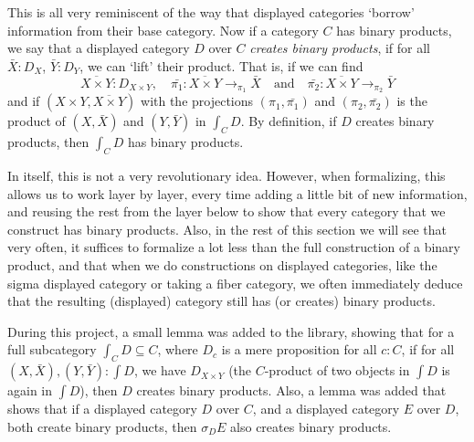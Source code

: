 This is all very reminiscent of the way that displayed categories `borrow' information from their base category. Now if a category $ C $ has binary products, we say that a displayed category $ D $ over $ C $ \textit{creates binary products}, if for all $ \bar X : D_X $, $ \bar Y : D_Y $, we can `lift' their product. That is, if we can find
\[ \overline{X \times Y} : D_{X \times Y}, \quad \bar{\pi_1} : \overline{X \times Y} \to_{\pi_1} \bar X \quad \text{and} \quad \bar{\pi_2} : \overline{X \times Y} \to_{\pi_2} \bar Y \]
and if $ (X \times Y, \overline{X \times Y}) $ with the projections $ (\pi_1, \bar{\pi_1}) $ and $ (\pi_2, \bar{\pi_2}) $ is the product of $ (X, \bar X) $ and $ (Y, \bar Y) $ in $ \int_C D $. By definition, if $ D $ creates binary products, then $ \int_C D $ has binary products.

In itself, this is not a very revolutionary idea. However, when formalizing, this allows us to work layer by layer, every time adding a little bit of new information, and reusing the rest from the layer below to show that every category that we construct has binary products. Also, in the rest of this section we will see that very often, it suffices to formalize a lot less than the full construction of a binary product, and that when we do constructions on displayed categories, like the sigma displayed category or taking a fiber category, we often immediately deduce that the resulting (displayed) category still has (or creates) binary products.

During this project, a small lemma was added to the library, showing that for a full subcategory $ \int_C D \subseteq C $, where $ D_c $ is a mere proposition for all $ c : C $, if for all $ (X, \bar X), (Y, \bar Y) : \int D $, we have $ D_{X \times Y} $ (the $ C $-product of two objects in $ \int D $ is again in $ \int D $), then $ D $ creates binary products. Also, a lemma was added that shows that if a displayed category $ D $ over $ C $, and a displayed category $ E $ over $ D $, both create binary products, then $ \sigma_D E $ also creates binary products.

